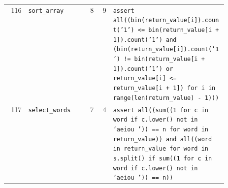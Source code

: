 \begin{footnotesize}
\begin{longtable}{@{}r l r r p{0.52\linewidth}@{}}
116 & \texttt{sort\_array} & 8 & 9 & \texttt{assert \allowbreak{}all(\allowbreak{}(\allowbreak{}bin(\allowbreak{}return\_value[\allowbreak{}i]\allowbreak{})\allowbreak{}.\allowbreak{}count(\allowbreak{}'\allowbreak{}1'\allowbreak{})\allowbreak{} \allowbreak{}<\allowbreak{}=\allowbreak{} \allowbreak{}bin(\allowbreak{}return\_value[\allowbreak{}i \allowbreak{}+\allowbreak{} \allowbreak{}1]\allowbreak{})\allowbreak{}.\allowbreak{}count(\allowbreak{}'\allowbreak{}1'\allowbreak{})\allowbreak{} \allowbreak{}and \allowbreak{}(\allowbreak{}bin(\allowbreak{}return\_value[\allowbreak{}i]\allowbreak{})\allowbreak{}.\allowbreak{}count(\allowbreak{}'\allowbreak{}1'\allowbreak{})\allowbreak{} \allowbreak{}!=\allowbreak{} \allowbreak{}bin(\allowbreak{}return\_value[\allowbreak{}i \allowbreak{}+\allowbreak{} \allowbreak{}1]\allowbreak{})\allowbreak{}.\allowbreak{}count(\allowbreak{}'\allowbreak{}1'\allowbreak{})\allowbreak{} \allowbreak{}or \allowbreak{}return\_value[\allowbreak{}i]\allowbreak{} \allowbreak{}<\allowbreak{}=\allowbreak{} \allowbreak{}return\_value[\allowbreak{}i \allowbreak{}+\allowbreak{} \allowbreak{}1]\allowbreak{})\allowbreak{} \allowbreak{}for \allowbreak{}i \allowbreak{}in \allowbreak{}range(\allowbreak{}len(\allowbreak{}return\_value)\allowbreak{} \allowbreak{}-\allowbreak{} \allowbreak{}1)\allowbreak{})\allowbreak{})\allowbreak{}} \\
117 & \texttt{select\_words} & 7 & 4 & \texttt{assert \allowbreak{}all(\allowbreak{}(\allowbreak{}sum(\allowbreak{}(\allowbreak{}1 \allowbreak{}for \allowbreak{}c \allowbreak{}in \allowbreak{}word \allowbreak{}if \allowbreak{}c.\allowbreak{}lower(\allowbreak{})\allowbreak{} \allowbreak{}not \allowbreak{}in \allowbreak{}'\allowbreak{}aeiou \allowbreak{}'\allowbreak{})\allowbreak{})\allowbreak{} \allowbreak{}=\allowbreak{}=\allowbreak{} \allowbreak{}n \allowbreak{}for \allowbreak{}word \allowbreak{}in \allowbreak{}return\_value)\allowbreak{})\allowbreak{} \allowbreak{}and \allowbreak{}all(\allowbreak{}(\allowbreak{}word \allowbreak{}in \allowbreak{}return\_value \allowbreak{}for \allowbreak{}word \allowbreak{}in \allowbreak{}s.\allowbreak{}split(\allowbreak{})\allowbreak{} \allowbreak{}if \allowbreak{}sum(\allowbreak{}(\allowbreak{}1 \allowbreak{}for \allowbreak{}c \allowbreak{}in \allowbreak{}word \allowbreak{}if \allowbreak{}c.\allowbreak{}lower(\allowbreak{})\allowbreak{} \allowbreak{}not \allowbreak{}in \allowbreak{}'\allowbreak{}aeiou \allowbreak{}'\allowbreak{})\allowbreak{})\allowbreak{} \allowbreak{}=\allowbreak{}=\allowbreak{} \allowbreak{}n)\allowbreak{})\allowbreak{}} \\

\end{longtable}
\end{footnotesize}
